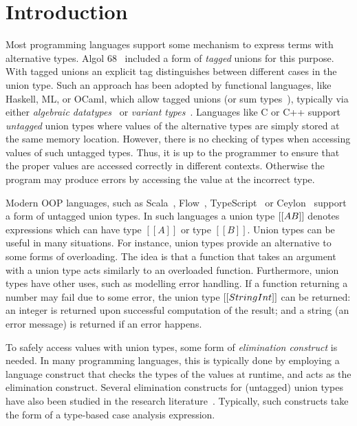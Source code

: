 \section{Introduction}
\label{sec:intro}

Most programming languages support some mechanism to express terms
with alternative types. Algol 68~\cite{} included a form of
\emph{tagged} unions for this purpose. With tagged unions
an explicit tag distinguishes between different cases in the
union type.
Such an approach has been adopted by functional languages, like Haskell, ML, or
OCaml, which allow tagged unions (or sum types~\cite{}), typically via
either \emph{algebraic datatypes}~\cite{} or \emph{variant types}~\cite{}.
Languages like C or C++ support \emph{untagged} union types where
values of the alternative types are simply stored at the same memory
location. However, there is no checking of types when accessing values of
such untagged types. Thus, it is up to the programmer to ensure that the proper
values are accessed correctly in different contexts. Otherwise the
program may produce errors by accessing the value at the incorrect type.

Modern OOP languages, such as Scala~\cite{}, Flow~\cite{},
TypeScript~\cite{} or Ceylon~\cite{} support a form
of untagged union types.
In such languages a union type $[[A \/ B]]$ denotes expressions which can have type
$[[A]]$ or type $[[B]]$. Union types can be useful in many situations.
For instance, union types provide an alternative to some forms
of overloading. The idea is that a function that takes an argument
with a union type acts similarly to an overloaded function.
Furthermore, union types have other uses, such as modelling error handling.
If a function returning a number may fail due to some
error, the union type $[[String \/ Int]]$ can be returned: an integer
is returned upon successful computation of the result; and
a string (an error message) is returned if an error happens.

To safely access values with union types, some form of
\emph{elimination construct} is needed. In many programming languages,
this is typically done by employing a language construct that checks
the types of the values at runtime, and acts as the elimination
construct. Several elimination constructs for (untagged) union types
have also been studied in the research literature~\cite{}. Typically,
such constructs take the form of a type-based case analysis
expression.

